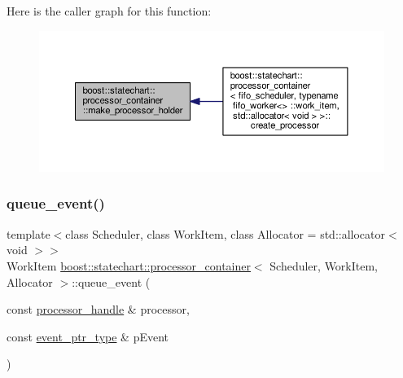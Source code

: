 Here is the caller graph for this function\+:
\nopagebreak
\begin{figure}[H]
\begin{center}
\leavevmode
\includegraphics[width=350pt]{classboost_1_1statechart_1_1processor__container_a04c9968abd3eb95f1a6fcb171166c5f6_icgraph}
\end{center}
\end{figure}
\mbox{\label{classboost_1_1statechart_1_1processor__container_af734be4c5c3d87830dae2cbb08c9223e}} 
\subsubsection{\texorpdfstring{queue\+\_\+event()}{queue\_event()}}
{\footnotesize\ttfamily template$<$class Scheduler, class Work\+Item, class Allocator = std\+::allocator$<$ void $>$$>$ \\
Work\+Item \mbox{\hyperlink{classboost_1_1statechart_1_1processor__container}{boost\+::statechart\+::processor\+\_\+container}}$<$ Scheduler, Work\+Item, Allocator $>$\+::queue\+\_\+event (\begin{DoxyParamCaption}\item[{const \mbox{\hyperlink{classboost_1_1statechart_1_1processor__container_a82ebbffaed81d7b99119ae0e892f6411}{processor\+\_\+handle}} \&}]{processor,  }\item[{const \mbox{\hyperlink{classboost_1_1statechart_1_1processor__container_a0123b4f1061816fce5aa2c2ec4c06934}{event\+\_\+ptr\+\_\+type}} \&}]{p\+Event }\end{DoxyParamCaption})\hspace{0.3cm}{\ttfamily [inline]}}

